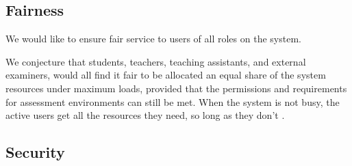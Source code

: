 \subsection{Fairness}

We would like to ensure fair service to users of all roles on the system.

We conjecture that students, teachers, teaching assistants, and external
examiners, would all find it fair to be allocated an equal share of the system
resources under maximum loads, provided that the permissions and requirements
for assessment environments can still be met. When the system is not busy, the
active users get all the resources they need, so long as they don't .

\subsection{Security}


